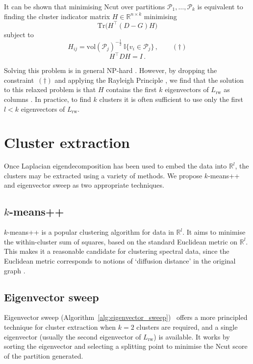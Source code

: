 \documentclass[12pt]{ociamthesis}
\theoremstyle{plain}
\theoremstyle{definition}
\theoremstyle{remark}
\newcommand\bb[1]{\mathbb{#1}}
\newcommand\ca[1]{\mathcal{#1}}
\begin{document}
It can be shown \cite{von2007tutorial} that minimising Ncut over partitions
$ \ca{P}_1, \ldots, \ca{P}_k $ is equivalent to finding the cluster indicator
matrix $H \in \bb{R}^{n \times k}$ minimising
$$ \mathrm{Tr} \big( H^\top (D-G) H \big) $$
subject to
$$ H_{i j} = \mathrm{vol}(\ca{P}_j)^{-\frac{1}{2}} \ \bb{I} \{ v_i \in \ca{P}_j
\}\,, \qquad (\dagger) $$
$$ H^\top D H = I\,. $$

Solving this problem is in general \textsf{NP}-hard \cite{wagner1993between}.
However, by dropping the constraint~$(\dagger)$ and applying the Rayleigh
Principle \cite{lutkepohl1996handbook}, we find that the solution to this
relaxed problem is that $H$ contains the first $k$ eigenvectors of
$L_\mathrm{rw}$ as columns \cite{von2007tutorial}.
In practice, to find $k$ clusters it is often sufficient to use only the first
$l < k$ eigenvectors of $L_\mathrm{rw}$.

\section{Cluster extraction} \label{sec:spectral_cluster_extraction}

Once Laplacian eigendecomposition has been used to embed the data into
$\bb{R}^l$, the clusters may be extracted using a variety of methods. We
propose $k$-means++ and eigenvector sweep as two appropriate techniques.

\subsection{\texorpdfstring{$k$}{k}-means++}

$k$-means++ \cite{arthur2007k} is a popular clustering algorithm for data in
$\bb{R}^l$.
It aims to minimise the within-cluster sum of squares, based on the standard
Euclidean metric on $\bb{R}^l$.
This makes it a reasonable candidate for clustering spectral data, since the
Euclidean metric corresponds to notions of `diffusion distance' in the original
graph \cite{nadler2006diffusion}.

\subsection{Eigenvector sweep} \label{sec:spectral_sweep}

Eigenvector sweep
(Algorithm~\ref{alg:eigenvector_sweep})~\cite{shi2000normalized} offers a more
principled technique for cluster extraction when $k=2$ clusters are required,
and a single eigenvector (usually the second eigenvector of $L_\mathrm{rw}$) is
available. It works by sorting the eigenvector and selecting a splitting point
to minimise the Ncut score of the partition generated.
\end{document}
